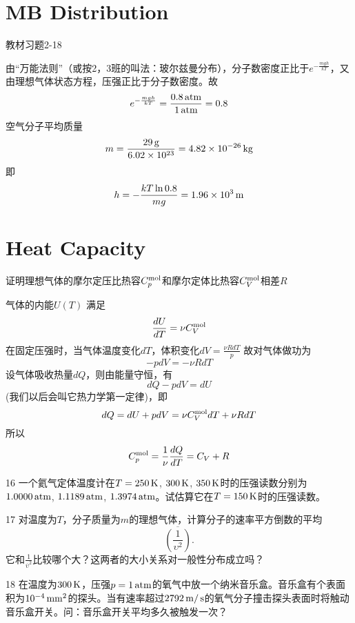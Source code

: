 \documentclass[CJK]{beamer}
\begin{document}
\section{MB Distribution}

\begin{frame}
\bch
{\blue 教材习题2-18}

\skipline

{\scriptsize
由“万能法则”（或按2，3班的叫法：玻尔兹曼分布），分子数密度正比于$e^{-\frac{mgh}{kT}}$，又由理想气体状态方程，压强正比于分子数密度。故
$$ e^{-\frac{mgh}{kT}} = \frac{0.8\,\mathrm{atm}}{1\,\mathrm{atm}} = 0.8$$
空气分子平均质量
$$m = \frac{29\,\mathrm{g}}{6.02\times 10^{23}} = 4.82\times 10^{-26}\,\mathrm{kg}$$
即
$$h = -\frac{kT\ln 0.8}{mg} = 1.96\times 10^3 \,\mathrm{m}$$ 
}
\ech
\end{frame}

\section{Heat Capacity}


\begin{frame}
\bch
{\blue 证明理想气体的摩尔定压比热容$C_p^{\rm mol}$和摩尔定体比热容$C_V^{\rm mol}$相差$R$}

\skipline
{\scriptsize
气体的内能$U(T)$ 满足
$$\frac{dU}{dT} = \nu C_V^{\rm mol}$$
在固定压强时，当气体温度变化$dT$，体积变化$dV = \frac{ \nu R dT}{p}$
故对气体做功为
$$-p dV = - \nu R dT$$
设气体吸收热量$dQ$，则由能量守恒，有
$$dQ - pdV = dU$$
(我们以后会叫它热力学第一定律)，即
$$dQ = dU + pdV =  \nu C_V^{\rm mol}dT + \nu RdT$$
所以
$$C_p^{\rm mol} = \frac{1}{\nu} \frac{dQ}{dT} = C_V + R$$

}
\ech
\end{frame}

\begin{frame}
\bch
\bitem
\item[16]{一个氦气定体温度计在$T = 250\,\mathrm{K}$, $300\,\mathrm{K}$, $350\,\mathrm{K}$时的压强读数分别为$1.0000\,\mathrm{atm}$, $1.1189\,\mathrm{atm}$, $1.3974\,\mathrm{atm}$。试估算它在$T=150\,\mathrm{K}$时的压强读数。}
\item[17]{对温度为$T$，分子质量为$m$的理想气体，计算分子的速率平方倒数的平均$$\overline{\left(\frac{1}{\upsilon^2}\right)}.$$它和$\frac{1}{\overline{\upsilon}^2}$比较哪个大？这两者的大小关系对一般性分布成立吗？}
\item[18]{在温度为$300\,\mathrm{K}$，压强$p = 1\,\mathrm{atm}$的氧气中放一个纳米音乐盒。音乐盒有个表面积为$10^{-4}\,\mathrm{mm}^2$的探头。当有速率超过$2792\,\mathrm{m}/\,\mathrm{s}$的氧气分子撞击探头表面时将触动音乐盒开关。问：音乐盒开关平均多久被触发一次？}
\eitem
\ech
\end{frame}
\end{document}

